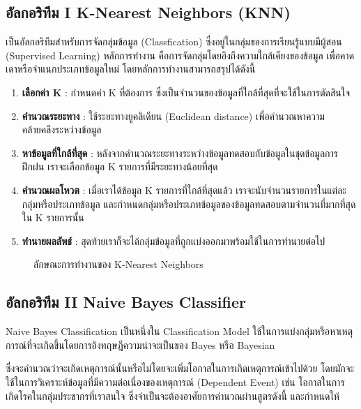 \subsection{อัลกอริทึม I K-Nearest Neighbors (KNN)}

เป็นอัลกอริทึมสำหรับการจัดกลุ่มข้อมูล (Classfication) ซึ่งอยู่ในกลุ่มของการเรียนรู้แบบมีผู้สอน (Supervised Learning)
หลักการทำงาน คือการจัดกลุ่มโดยอิงถึงความใกล้เคียงของข้อมูล เพื่อคาดเดาหรือจำแนกประเภทข้อมูลใหม่ \cite{kNeighbor} โดยหลักการทำงานสามารถสรุปได้ดังนี้
\begin{enumerate}
    \item  \textbf{เลือกค่า K} : กำหนดค่า K ที่ต้องการ ซึ่งเป็นจำนวนของข้อมูลที่ใกล้ที่สุดที่จะใช้ในการตัดสินใจ
    \item  \textbf{คำนวณระยะทาง} : ใช้ระยะทางยูคลิเดียน (Euclidean distance) เพื่อคำนวณหาความคล้ายคลึงระหว่างข้อมูล
    \item  \textbf{หาข้อมูลที่ใกล้ที่สุด} : หลังจากคำนวณระยะทางระหว่างข้อมูลทดสอบกับข้อมูลในชุดข้อมูลการฝึกฝน เราจะเลือกข้อมูล K รายการที่มีระยะทางน้อยที่สุด
    \item  \textbf{คำนวณผลโหวต} : เมื่อเราได้ข้อมูล K รายการที่ใกล้ที่สุดแล้ว เราจะนับจำนวนรายการในแต่ละกลุ่มหรือประเภทข้อมูล 
    และกำหนดกลุ่มหรือประเภทข้อมูลของข้อมูลทดสอบตามจำนวนที่มากที่สุดใน K รายการนั้น
    \item  \textbf{ทำนายผลลัพธ์} : สุดท้ายเราก็จะได้กลุ่มข้อมูลที่ถูกแบ่งออกมาพร้อมใช้ในการทำนายต่อไป
\end{enumerate}

\begin{figure}[!h]\centering
    \setlength{\fboxrule}{0.2mm} %
    \setlength{\fboxsep}{1cm}
    \caption{ลักษณะการทำงานของ K-Nearest Neighbors}\label{fig:model2}
\end{figure}

\subsection{อัลกอริทึม II Naive Bayes Classifier}
Naive Bayes Classification เป็นหนึ่งใน Classification Model ใช้ในการแบ่งกลุ่มหรือหาเหตุการณ์ที่จะเกิดขึ้นโดยการอิงทฤษฎีความน่าจะเป็นของ 
Bayes หรือ Bayesian 
\par ซึ่งจะคำนวณว่าจะเกิดเหตุการณ์นั้นหรือไม่โดยจะเพิ่มโอกาสในการเกิดเหตุการณ์เข้าไปด้วย 
โดยมักจะใช้ในการวิเคราะห์ข้อมูลที่มีความต่อเนื่องของเหตุการณ์ (Dependent Event) เช่น 
โอกาสในการเกิดโรคในกลุ่มประชากรที่เราสนใจ \cite{naiveBayes-1,naiveBayes-2} ซึ่งจำเป็นจะต้องอาศัยการคำนวณผ่านสูตรดังนี้ และกำหนดให้

